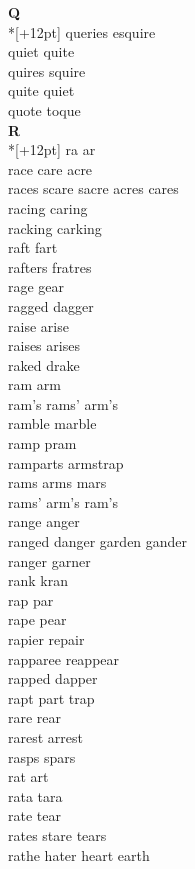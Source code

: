 \vspace{14pt}
\noindent\textbf{\Large Q}\\*[+12pt]
queries esquire\\
quiet quite\\
quires squire\\
quite quiet\\
quote toque\\

\vspace{14pt}
\noindent\textbf{\Large R}\\*[+12pt]
ra ar\\
race care acre\\
races scare sacre acres cares\\
racing caring\\
racking carking\\
raft fart\\
rafters fratres\\
rage gear\\
ragged dagger\\
raise arise\\
raises arises\\
raked drake\\
ram arm\\
ram's rams' arm's\\
ramble marble\\
ramp pram\\
ramparts armstrap\\
rams arms mars\\
rams' arm's ram's\\
range anger\\
ranged danger garden gander\\
ranger garner\\
rank kran\\
rap par\\
rape pear\\
rapier repair\\
rapparee reappear\\
rapped dapper\\
rapt part trap\\
rare rear\\
rarest arrest\\
rasps spars\\
rat art\\
rata tara\\
rate tear\\
rates stare tears\\
rathe hater heart earth\\
